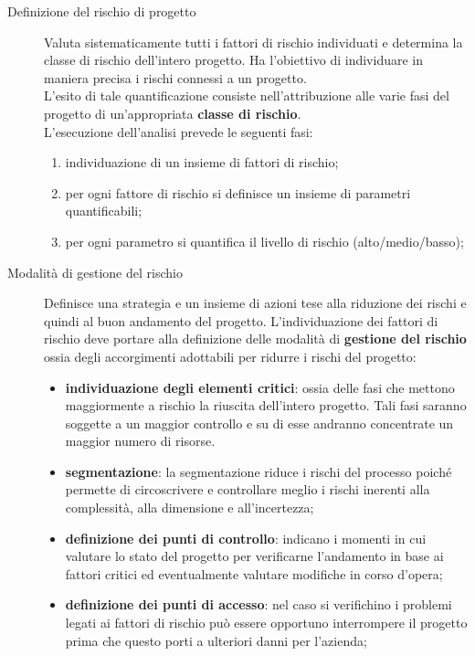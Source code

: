 \begin{description}
    \item[Definizione del rischio di progetto] Valuta sistematicamente tutti i fattori di rischio individuati e determina la classe di rischio dell'intero progetto.
    Ha l'obiettivo di individuare in maniera precisa i rischi connessi a un progetto.
    \\
    L'esito di tale quantificazione consiste nell'attribuzione alle varie fasi del progetto di un'appropriata \textbf{classe di rischio}.
    \\
    L'esecuzione dell'analisi prevede le seguenti fasi:
        \begin{enumerate}
            \item individuazione di un insieme di fattori di rischio;
            \item per ogni fattore di rischio si definisce un insieme di parametri quantificabili;
            \item per ogni parametro si quantifica il livello di rischio (alto/medio/basso);
        \end{enumerate}
    \item[Modalità di gestione del rischio] Definisce una strategia e un insieme di azioni tese alla riduzione dei rischi e quindi al buon andamento del progetto.
        L'individuazione dei fattori di rischio deve portare alla definizione delle modalità di \textbf{gestione del rischio} ossia degli accorgimenti adottabili per ridurre i rischi del progetto:
        \begin{itemize}
            \item \textbf{individuazione degli elementi critici}: ossia delle fasi che mettono maggiormente a rischio la riuscita dell'intero progetto.
                Tali fasi saranno soggette a un maggior controllo e su di esse andranno concentrate un maggior numero di risorse.
            \item \textbf{segmentazione}: la segmentazione riduce i rischi del processo poiché permette di circoscrivere e controllare meglio i rischi inerenti alla complessità, alla dimensione e all'incertezza;
            \item \textbf{definizione dei punti di controllo}: indicano i momenti in cui valutare lo stato del progetto per verificarne l'andamento in base ai fattori critici ed eventualmente valutare modifiche in corso d'opera;
            \item \textbf{definizione dei punti di accesso}: nel caso si verifichino i problemi legati ai fattori di rischio può essere opportuno interrompere il progetto prima che questo porti a ulteriori danni per l'azienda;
        \end{itemize}
\end{description}
%

